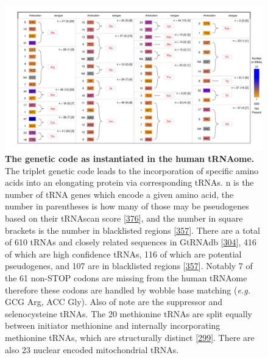 \documentclass[
]{book}
\begin{document}
\begin{figure}

{\centering \includegraphics[width=1\linewidth]{figs/kutteresq_BLcount} 

}

\caption{\textbf{The genetic code as instantiated in the human tRNAome.} The triplet genetic code leads to the incorporation of specific amino acids into an elongating protein via corresponding tRNAs. n is the number of tRNA genes which encode a given amino acid, the number in parentheses is how many of those may be pseudogenes based on their tRNAscan score {[}\protect\hyperlink{ref-Lowe2016}{376}{]}, and the number in square brackets is the number in blacklisted regions {[}\protect\hyperlink{ref-Amemiya2019}{357}{]}. There are a total of 610 tRNAs and closely related sequences in GtRNAdb {[}\protect\hyperlink{ref-Chan2009}{304}{]}, 416 of which are high confidence tRNAs, 116 of which are potential pseudogenes, and 107 are in blacklisted regions {[}\protect\hyperlink{ref-Amemiya2019}{357}{]}. Notably 7 of the 61 non-STOP codons are missing from the human tRNAome therefore these codons are handled by wobble base matching (\emph{e.g.} GCG Arg, ACC Gly). Also of note are the suppressor and selenocysteine tRNAs. The 20 methionine tRNAs are split equally between initiator methionine and internally incorporating methionine tRNAs, which are structurally distinct {[}\protect\hyperlink{ref-Kolitz2010}{299}{]}. There are also 23 nuclear encoded mitochondrial tRNAs.}\label{fig:kutteresq}
\end{figure}
\end{document}
